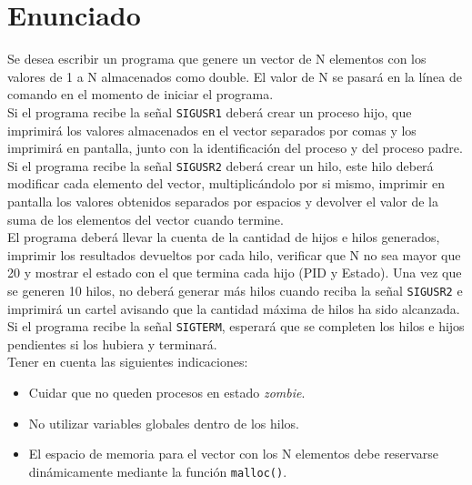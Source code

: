 \section{Enunciado}
Se desea escribir un programa que genere un vector de N elementos con los valores de 1 a N almacenados como double. El valor de N se pasará en la línea de comando en el momento de iniciar el programa.\\

Si el programa recibe la señal \texttt{SIGUSR1} deberá crear un proceso hijo, que imprimirá los valores almacenados en el vector separados por comas y los imprimirá en pantalla, junto con la identificación del proceso y del proceso padre.\\

Si el programa recibe la señal \texttt{SIGUSR2} deberá crear un hilo, este hilo deberá modificar cada elemento
del vector, multiplicándolo por si mismo, imprimir en pantalla los valores obtenidos separados por espacios y devolver el valor de la suma de los elementos del vector cuando termine.\\

El programa deberá llevar la cuenta de la cantidad de hijos e hilos generados, imprimir los resultados
devueltos por cada hilo, verificar que N no sea mayor que 20 y mostrar el estado con el que termina
cada hijo (PID y Estado). Una vez que se generen 10 hilos, no deberá generar más hilos cuando reciba
la señal \texttt{SIGUSR2} e imprimirá un cartel avisando que la cantidad máxima de hilos ha sido alcanzada.\\

Si el programa recibe la señal \texttt{SIGTERM}, esperará que se completen los hilos e hijos pendientes si los
hubiera y terminará.\\

Tener en cuenta las siguientes indicaciones:
\begin{itemize}
    \item Cuidar que no queden procesos en estado \textit{zombie}.
    \item No utilizar variables globales dentro de los hilos.
    \item El espacio de memoria para el vector con los N elementos debe reservarse dinámicamente
mediante la función \texttt{malloc()}.
\end{itemize}
